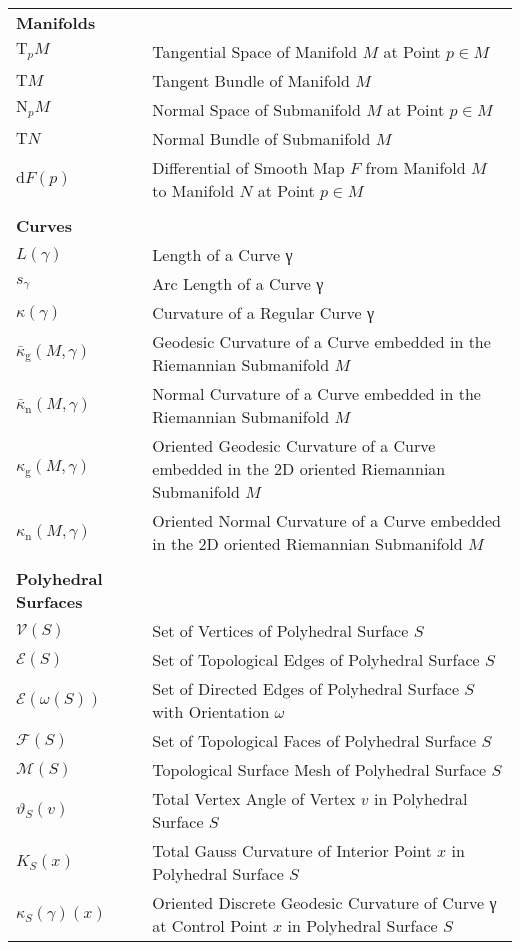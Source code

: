 \documentclass[crop=false,10pt,ngerman]{standalone}
\begin{document}
{\begin{tabularx}{\textwidth}{p{}p{}}
      \\
      \hline
      \textbf{Manifolds} & \\
      $\mathrm{T}_p M$ & Tangential Space of Manifold $M$ at Point $p\in M$ \\
      $\mathrm{T}M$ & Tangent Bundle of Manifold $M$ \\
      $\mathrm{N}_p M$ & Normal Space of Submanifold $M$ at Point $p\in M$ \\
      $\mathrm{T}N$ & Normal Bundle of Submanifold $M$ \\
      $\mathrm{d}F(p)$ & Differential of Smooth Map $F$ from Manifold $M$ to Manifold $N$ at Point $p\in M$ \\

      \\
      \hline
      \textbf{Curves} & \\
      $L(γ)$ & Length of a Curve γ \\
      $s_γ$ & Arc Length of a Curve γ \\
      $κ(γ)$ & Curvature of a Regular Curve γ \\
      $\bar{κ}_\mathrm{g}(M,γ)$ & Geodesic Curvature of a Curve embedded in the Riemannian Submanifold $M$ \\
      $\bar{κ}_\mathrm{n}(M,γ)$ & Normal Curvature of a Curve embedded in the Riemannian Submanifold $M$ \\
      $κ_\mathrm{g}(M,γ)$ & Oriented Geodesic Curvature of a Curve embedded in the 2D oriented Riemannian Submanifold $M$ \\
      $κ_\mathrm{n}(M,γ)$ & Oriented Normal Curvature of a Curve embedded in the 2D oriented Riemannian Submanifold $M$ \\

      \\
      \hline
      \textbf{Polyhedral Surfaces} & \\
      $\mathscr{V}(S)$ & Set of Vertices of Polyhedral Surface $S$ \\
      $\mathscr{E}(S)$ & Set of Topological Edges of Polyhedral Surface $S$ \\
      $\mathscr{E}(ω(S))$ & Set of Directed Edges of Polyhedral Surface $S$ with Orientation $ω$ \\
      $\mathscr{F}(S)$ & Set of Topological Faces of Polyhedral Surface $S$ \\
      $\mathscr{M}(S)$ & Topological Surface Mesh of Polyhedral Surface $S$ \\
      $ϑ_S(v)$ & Total Vertex Angle of Vertex $v$ in Polyhedral Surface $S$ \\
      $K_S(x)$ & Total Gauss Curvature of Interior Point $x$ in Polyhedral Surface $S$ \\
      $κ_S(γ)(x)$ & Oriented Discrete Geodesic Curvature of Curve γ at Control Point $x$ in Polyhedral Surface $S$ \\


\end{tabularx}}
\end{document}
